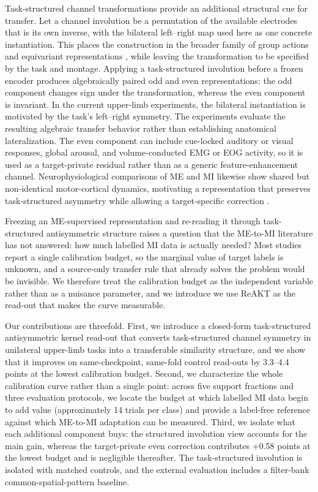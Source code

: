 \documentclass[preprint,12pt]{elsarticle}
\begin{document}
Task-structured channel transformations provide an additional structural cue for transfer. Let a channel involution be a permutation of the available electrodes that is its own inverse, with the bilateral left--right map used here as one concrete instantiation. This places the construction in the broader family of group actions and equivariant representations \cite{cohen2016group,kondor2018general}, while leaving the transformation to be specified by the task and montage. Applying a task-structured involution before a frozen encoder produces algebraically paired odd and even representations: the odd component changes sign under the transformation, whereas the even component is invariant. In the current upper-limb experiments, the bilateral instantiation is motivated by the task's left--right symmetry. The experiments evaluate the resulting algebraic transfer behavior rather than establishing anatomical lateralization. The even component can include cue-locked auditory or visual responses, global arousal, and volume-conducted EMG or EOG activity, so it is used as a target-private residual rather than as a generic feature-enhancement channel. Neurophysiological comparisons of ME and MI likewise show shared but non-identical motor-cortical dynamics, motivating a representation that preserves task-structured asymmetry while allowing a target-specific correction \cite{miller2010cortical}.

Freezing an ME-supervised representation and re-reading it through
task-structured antisymmetric structure raises a question that the ME-to-MI
literature has not answered: how much labelled MI data is actually needed? Most
studies report a single calibration budget, so the marginal value of target
labels is unknown, and a source-only transfer rule that already solves the
problem would be invisible. We therefore treat the calibration budget as the
independent variable rather than as a nuisance parameter, and we introduce
we use ReAKT as the read-out that makes the
curve measurable.

Our contributions are threefold. First, we introduce a closed-form
task-structured antisymmetric kernel read-out that converts task-structured channel
symmetry in unilateral upper-limb tasks into a transferable similarity
structure, and we show that it improves on same-checkpoint, same-fold control
read-outs by 3.3--4.4 points at the lowest calibration budget. Second, we
characterize the whole calibration curve rather than a single point: across
five support fractions and three evaluation protocols, we locate the budget at which labelled
MI data begin to add value (approximately 14 trials per class) and provide a
label-free reference against which ME-to-MI adaptation can be measured. Third,
we isolate what each additional component buys: the structured involution view accounts
for the main gain, whereas the target-private even correction contributes
+0.58 points at the lowest budget and is negligible thereafter.
The task-structured involution is isolated with matched controls, and the external
evaluation includes a filter-bank common-spatial-pattern baseline.
\end{document}
